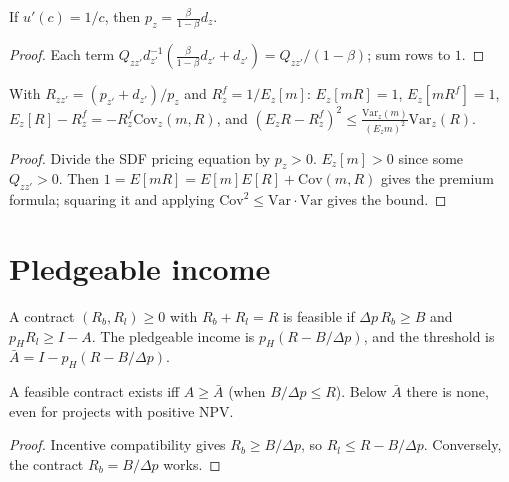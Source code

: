 \begin{theorem}
\label{thm:lt_log}
\leanok
{}
If $u'(c) = 1/c$, then $p_z = \frac{\beta}{1-\beta}d_z$.
\end{theorem}
\begin{proof}
\leanok
Each term $Q_{zz'}d_{z'}^{-1}(\frac{\beta}{1-\beta}d_{z'} + d_{z'}) = Q_{zz'}/(1-\beta)$; sum rows to $1$.
\end{proof}

\begin{theorem}
\label{thm:lt_returns}
\leanok
{}
With $R_{zz'} = (p_{z'} + d_{z'})/p_z$ and $R^f_z = 1/E_z[m]$: $E_z[mR] = 1$, $E_z[mR^f] = 1$,
$E_z[R] - R^f_z = -R^f_z\mathrm{Cov}_z(m, R)$, and $(E_zR - R^f_z)^2 \le \frac{\mathrm{Var}_z(m)}{(E_zm)^2}\mathrm{Var}_z(R)$.
\end{theorem}
\begin{proof}
\leanok
Divide the SDF pricing equation by $p_z > 0$. $E_z[m] > 0$ since some $Q_{zz'} > 0$. Then
$1 = E[mR] = E[m]E[R] + \mathrm{Cov}(m,R)$ gives the premium formula; squaring it and applying
$\mathrm{Cov}^2 \le \mathrm{Var}\cdot\mathrm{Var}$ gives the bound.
\end{proof}

\section{Pledgeable income}

\begin{definition}
\label{def:ht_model}
\leanok
A contract $(R_b, R_l) \ge 0$ with $R_b + R_l = R$ is feasible if $\Delta p\,R_b \ge B$ and $p_HR_l \ge I - A$. The
pledgeable income is $p_H(R - B/\Delta p)$, and the threshold is $\bar A = I - p_H(R - B/\Delta p)$.
\end{definition}

\begin{theorem}
\label{thm:ht}
\leanok
{}
A feasible contract exists iff $A \ge \bar A$ (when $B/\Delta p \le R$). Below $\bar A$ there is none, even for projects
with positive NPV.
\end{theorem}
\begin{proof}
\leanok
Incentive compatibility gives $R_b \ge B/\Delta p$, so $R_l \le R - B/\Delta p$. Conversely, the contract
$R_b = B/\Delta p$ works.
\end{proof}
